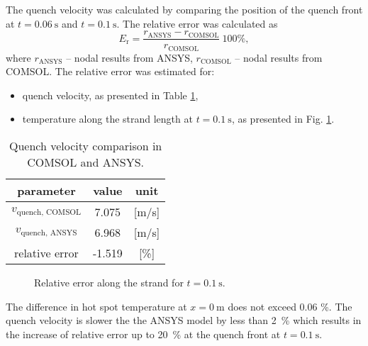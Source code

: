 The quench velocity was calculated by comparing the position of the quench front at $t=0.06~\text{s}$ and $t=0.1~\text{s}$. 
The relative error was calculated as
\begin{equation}
    E_\text{r} = \frac{r_\text{ANSYS}-r_\text{COMSOL}}{r_\text{COMSOL}}~100\%,
    \label{eqn:relative_error_comsol_ansys_benchmarking}
\end{equation}
where $r_\text{ANSYS}$ -- nodal results from ANSYS, $r_\text{COMSOL}$ -- nodal results from COMSOL. The relative error was estimated for:

\begin{itemize}
    \item quench velocity, as presented in Table \ref{table: 1d_no_insulation_v_quench_comparison},
    \item temperature along the strand length at $t=0.1~\text{s}$, as presented in Fig. \ref{fig: ans_comsol_comparison_rel_error_temp_f_2_2}.
\end{itemize}

\begin{table}[H]
    \caption{Quench velocity comparison in COMSOL and ANSYS.} 
    \vspace{-1.em} 
    \fontsize{10}{10}
    \selectfont 
    \renewcommand{\arraystretch}{1.5}
    \begin{center}
        \begin{tabular}{ ccc }  
        \hline
        parameter & value & unit \\
        \hline
        $v_\text{quench, COMSOL}$ & 7.075 & [m/s] \\
        $v_\text{quench, ANSYS}$ & 6.968 & [m/s] \\
        relative error & -1.519 & [\%] \\
        \hline 
        \end{tabular}
    \end{center}  
     \label{table: 1d_no_insulation_v_quench_comparison} 
 \end{table}

\begin{figure}[H]
\centering
    \caption{Relative error along the strand for $t=0.1~\text{s}$.}
    \label{fig: ans_comsol_comparison_rel_error_temp_f_2_2}
\end{figure}

The difference in hot spot temperature at $x=0~\text{m}$ does not exceed 0.06 \%. The quench velocity is slower the the ANSYS model by less than 2~\% which results in the increase of relative error up to 20~\% at the quench front at $t=0.1~\text{s}$.